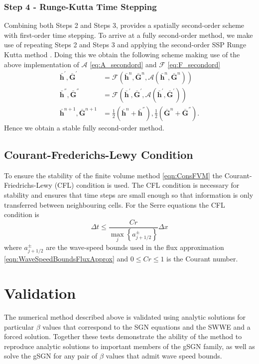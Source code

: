 \documentclass[10pt]{elsarticle}
\newcommand{\vecn}[1]{\boldsymbol{#1}}
\begin{document}
\subsubsection{Step 4 - Runge-Kutta Time Stepping}
Combining both Steps 2 and Steps 3, provides a spatially second-order scheme with first-order time stepping. To arrive at a fully second-order method, we make use of repeating Steps 2 and Steps 3 and applying the second-order SSP Runge Kutta method \cite{Gottlieb-etal-2003-89}. Doing this we obtain the following scheme making use of the above implementation of $\mathcal{A}$ \eqref{eq:A_secondord} and $\mathcal{F}$ \eqref{eq:F_secondord}
\begin{align}
\bar{\vecn{h}}^{'},\bar{\vecn{G}}^{'} &= \mathcal{F}\left(\bar{\vecn{h}}^n,\bar{\vecn{G}}^n,\mathcal{A}\left(\bar{\vecn{h}}^n,\bar{\vecn{G}}^n\right) \right) \\
\bar{\vecn{h}}^{''},\bar{\vecn{G}}^{''} &= \mathcal{F}\left(\bar{\vecn{h}}^{'},\bar{\vecn{G}}^{'},\mathcal{A}\left(\bar{\vecn{h}}^{'},\bar{\vecn{G}}^{'}\right) \right)\\
\bar{\vecn{h}}^{n+1},\bar{\vecn{G}}^{n+1} &= \frac{1}{2}\left(\bar{\vecn{h}}^n + \bar{\vecn{h}}^{''} \right) ,  \frac{1}{2}\left(\bar{\vecn{G}}^n + \bar{\vecn{G}}^{''} \right). 
\end{align}
Hence we obtain a stable fully second-order method. 

\subsection{Courant-Frederichs-Lewy Condition}
To ensure the stability of the finite volume method \eqref{eqn:ConsFVM} the Courant-Friedrichs-Lewy (CFL) condition \cite{Courant-etal-1967-215} is used. The CFL condition is necessary for stability and ensures that time steps are small enough so that information is only transferred between neighbouring cells. For the Serre equations the CFL condition is 
\begin{equation}
\Delta t \le \frac{Cr }{\max_{j} \left\lbrace a^\pm_{j+1/2} \right\rbrace} \Delta x
\label{eqn:CFLcond}
\end{equation}
where $a^\pm_{j+1/2} $ are the wave-speed bounds used in the flux approximation \eqref{eqn:WaveSpeedBoundsFluxApprox} and $0\le Cr \le 1$ is the Courant number. 

\section{Validation}
The numerical method described above is validated using analytic solutions for particular $\beta$ values that correspond to the SGN equations and the SWWE and a forced solution. Together these tests demonstrate the ability of the method to reproduce analytic solutions to important members of the gSGN family, as well as solve the gSGN for any pair of $\beta$ values that admit wave speed bounds.
\end{document}
